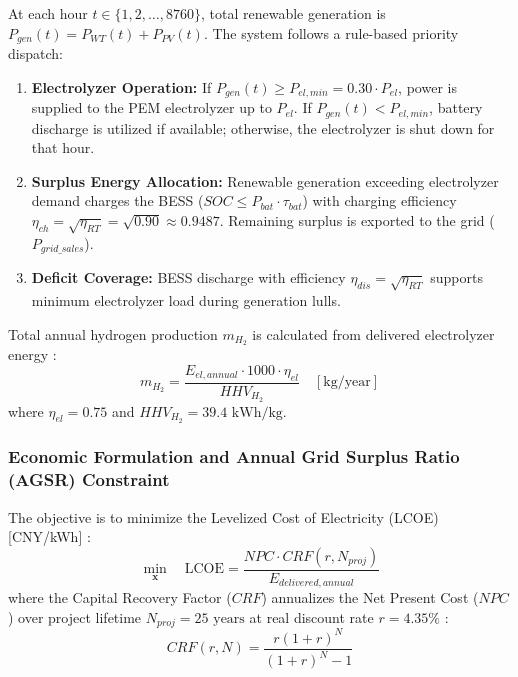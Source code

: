 \documentclass[review]{elsarticle}
\begin{document}
At each hour $t \in \{1, 2, \dots, 8760\}$, total renewable generation is $P_{gen}(t) = P_{WT}(t) + P_{PV}(t)$. The system follows a rule-based priority dispatch:
\begin{enumerate}
    \item \textbf{Electrolyzer Operation:} If $P_{gen}(t) \ge P_{el,min} = 0.30 \cdot P_{el}$, power is supplied to the PEM electrolyzer up to $P_{el}$. If $P_{gen}(t) < P_{el,min}$, battery discharge is utilized if available; otherwise, the electrolyzer is shut down for that hour.
    \item \textbf{Surplus Energy Allocation:} Renewable generation exceeding electrolyzer demand charges the BESS ($SOC \le P_{bat} \cdot \tau_{bat}$) with charging efficiency $\eta_{ch} = \sqrt{\eta_{RT}} = \sqrt{0.90} \approx 0.9487$. Remaining surplus is exported to the grid ($P_{grid\_sales}$).
    \item \textbf{Deficit Coverage:} BESS discharge with efficiency $\eta_{dis} = \sqrt{\eta_{RT}}$ supports minimum electrolyzer load during generation lulls.
\end{enumerate}

Total annual hydrogen production $m_{H_2}$ is calculated from delivered electrolyzer energy \cite{smaoui2015optimal}:
\begin{equation}
m_{H_2} = \frac{E_{el,annual} \cdot 1000 \cdot \eta_{el}}{HHV_{H_2}} \quad [\text{kg/year}]
\label{eq:h2_production}
\end{equation}
where $\eta_{el} = 0.75$ and $HHV_{H_2} = 39.4\text{ kWh/kg}$.


\subsubsection{Economic Formulation and Annual Grid Surplus Ratio (AGSR) Constraint}

The objective is to minimize the Levelized Cost of Electricity (LCOE) [CNY/kWh] \cite{malheiro2015integrated}:
\begin{equation}
\min_{\mathbf{x}} \quad \text{LCOE} = \frac{NPC \cdot CRF(r, N_{proj})}{E_{delivered,annual}}
\label{eq:lcoe_obj}
\end{equation}
where the Capital Recovery Factor ($CRF$) annualizes the Net Present Cost ($NPC$) over project lifetime $N_{proj} = 25\text{ years}$ at real discount rate $r = 4.35\%$ \cite{nagapurkar2019techno}:
\begin{equation}
CRF(r, N) = \frac{r(1+r)^N}{(1+r)^N - 1}
\label{eq:crf_factor}
\end{equation}
\end{document}
